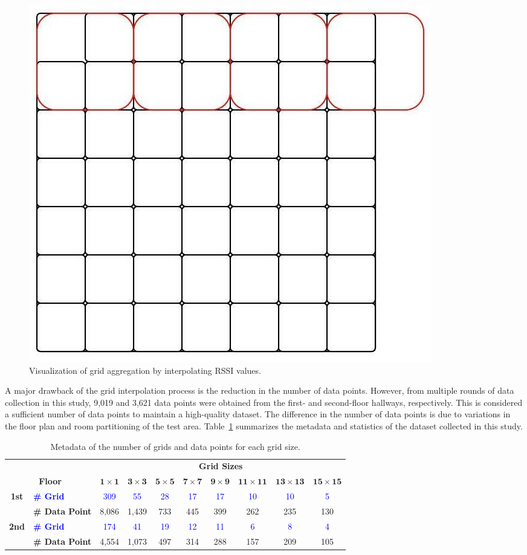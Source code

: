 \documentclass[runningheads]{llncs}
\begin{document}
\begin{figure}[th!]
        \centering
        \includegraphics[width=.3\linewidth]{figures/image14.jpg}
        \caption{Visualization of grid aggregation by interpolating RSSI values.}
        \label{fig:vis-grid-aggr}
\end{figure}

A major drawback of the grid interpolation process is the reduction in the number of data points. However, from multiple rounds of data collection in this study, 9,019 and 3,621 data points were obtained from the first- and second-floor hallways, respectively. This is considered a sufficient number of data points to maintain a high-quality dataset. The difference in the number of data points is due to variations in the floor plan and room partitioning of the test area. Table~\ref{tab:metadata} summarizes the metadata and statistics of the dataset collected in this study.

\begin{table}[th!]
        \caption{Metadata of the number of grids and data points for each grid size.}
        \label{tab:metadata}
        \centering
        \begin{tabular}{|c|l|c|c|c|c|c|c|c|c|}
                \hline
                \multicolumn{2}{|c|}{} & \multicolumn{8}{|c|}{\textbf{Grid Sizes}} \\
                \cline{3-10}
                \multicolumn{2}{|c|}{\textbf{Floor}} & $\mathbf{1\times1}$ & $\mathbf{3\times3}$ & $\mathbf{5\times5}$ & $\mathbf{7\times7}$ & $\mathbf{9\times9}$ & $\mathbf{11\times11}$ & $\mathbf{13\times13}$ & $\mathbf{15\times15}$ \\
                \hline
                \textbf{1st} & \textcolor{blue}{\textbf{\# Grid}} & \textcolor{blue}{309} & \textcolor{blue}{55} & \textcolor{blue}{28} & \textcolor{blue}{17} & \textcolor{blue}{17} & \textcolor{blue}{10} & \textcolor{blue}{10} & \textcolor{blue}{5} \\
                \cline{2-10}
                & \textbf{\# Data Point} & 8,086 & 1,439 & 733 & 445 & 399 & 262 & 235 & 130 \\
                \hline
                \textbf{2nd} & \textcolor{blue}{\textbf{\# Grid}} & \textcolor{blue}{174} & \textcolor{blue}{41} & \textcolor{blue}{19} & \textcolor{blue}{12} & \textcolor{blue}{11} & \textcolor{blue}{6} & \textcolor{blue}{8} & \textcolor{blue}{4} \\
                \cline{2-10}
                & \textbf{\# Data Point} & 4,554 & 1,073 & 497 & 314 & 288 & 157 & 209 & 105 \\
                \hline    
        \end{tabular}
\end{table}
\end{document}
